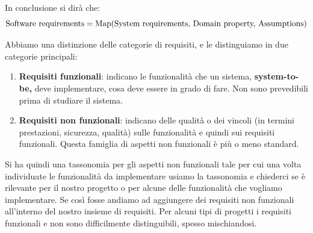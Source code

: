 In conclusione si dirà che:
$$\mbox{Software requirements}= \textnormal{Map(System requirements,  Domain  property,  Assumptions)}$$

Abbiamo una distinzione delle categorie di requisiti, e le distinguiamo in due categorie principali:
\begin{enumerate}
    \item \textbf{Requisiti funzionali}: indicano le funzionalità che un sistema,\textbf{ system-to-be,} deve implementare, cosa deve essere in grado di fare. Non sono prevedibili prima di studiare il sistema.
    \item \textbf{Requisiti non funzionali}: indicano delle qualità o dei vincoli (in termini prestazioni, sicurezza, qualità) sulle funzionalità e quindi sui requisiti funzionali. Questa famiglia di aspetti non funzionali è più o meno standard.
\end{enumerate}

Si ha quindi una tassonomia per gli aspetti non funzionali tale per cui una volta individuate le funzionalità da implementare usiamo la tassonomia e chiederci se è  rilevante per il nostro progetto o per alcune delle funzionalità che vogliamo implementare. Se così fosse andiamo ad aggiungere dei requisiti non funzionali all'interno del nostro insieme di requisiti. 
Per alcuni tipi di progetti i requisiti funzionali e non sono difficilmente distinguibili, spesso mischiandosi.

